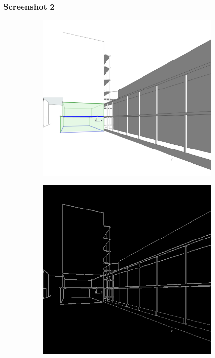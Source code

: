 \subsubsection{Screenshot 2}
\begin{figure}[H]
    \centering
    \begin{subfigure}[b]{0.3\textwidth}
        \centering
        \includegraphics[width=\textwidth]{Images/Results/Architect-B_unstructured-phase/screenshots/screenshot_2.png}
        \caption{}
        \label{A-unstructured-1-sketch}
    \end{subfigure}
    \begin{subfigure}[b]{0.3\textwidth}
        \centering 
        \includegraphics[width=\textwidth]{Images/Results/Architect-B_unstructured-phase/screenshots/screenshot_2_preprocessed.png}

\end{subfigure}
\end{figure}
